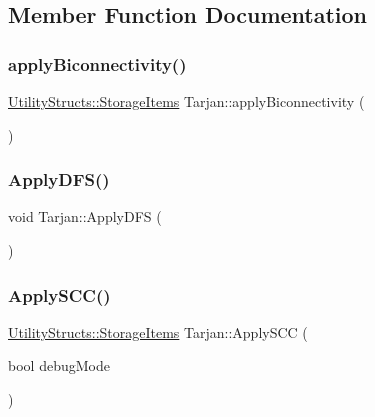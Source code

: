 \subsection{Member Function Documentation}
\mbox{\label{class_tarjan_a4be3dec188e347b54a90cd5f37abc268}} 
\subsubsection{\texorpdfstring{apply\+Biconnectivity()}{applyBiconnectivity()}}
{\footnotesize\ttfamily \hyperlink{struct_utility_structs_1_1_storage_items}{Utility\+Structs\+::\+Storage\+Items} Tarjan\+::apply\+Biconnectivity (\begin{DoxyParamCaption}{ }\end{DoxyParamCaption})}

\mbox{\label{class_tarjan_a674767d7e49ada6a738ab69187e4836d}} 
\subsubsection{\texorpdfstring{Apply\+D\+F\+S()}{ApplyDFS()}}
{\footnotesize\ttfamily void Tarjan\+::\+Apply\+D\+FS (\begin{DoxyParamCaption}{ }\end{DoxyParamCaption})}

\mbox{\label{class_tarjan_a58ad9fcfd599a608fa1671e4607db378}} 
\subsubsection{\texorpdfstring{Apply\+S\+C\+C()}{ApplySCC()}}
{\footnotesize\ttfamily \hyperlink{struct_utility_structs_1_1_storage_items}{Utility\+Structs\+::\+Storage\+Items} Tarjan\+::\+Apply\+S\+CC (\begin{DoxyParamCaption}\item[{bool}]{debug\+Mode }\end{DoxyParamCaption})}

\mbox{\label{class_tarjan_a52573be5a4930ad84f3807bc49f42026}} 
